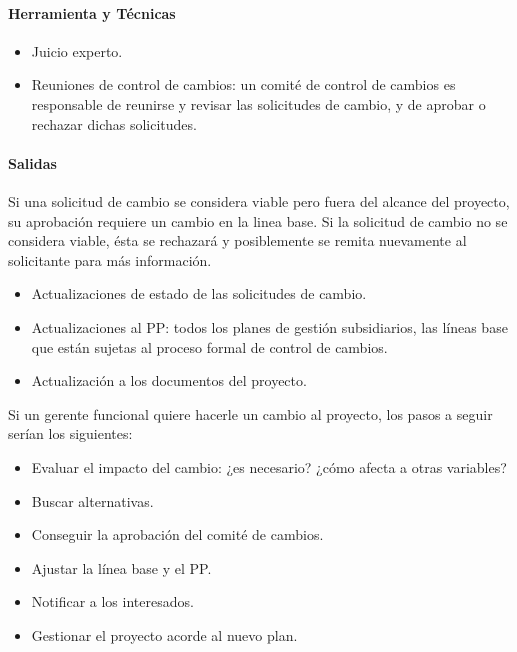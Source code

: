 \documentclass[a4paper,twosides]{article}
\newlength{\wideitemsep}
\let\olditem\item
\renewcommand{\item}{\setlength{\itemsep}{\wideitemsep}\olditem}
\begin{document}
\paragraph{Herramienta y Técnicas}
\begin{itemize}
\item Juicio experto.
\item Reuniones de control de cambios: un comité de control de cambios es responsable de reunirse y revisar las solicitudes de cambio, y de aprobar o rechazar dichas solicitudes.
\end{itemize}
\paragraph{Salidas}
Si una solicitud de cambio se considera viable pero fuera del alcance del proyecto, su aprobación requiere un cambio en la linea base. Si la solicitud de cambio no se considera viable, ésta se rechazará y posiblemente se remita nuevamente al solicitante para más información.
\begin{itemize}
\item Actualizaciones de estado de las solicitudes de cambio.
\item Actualizaciones al PP: todos los planes de gestión subsidiarios, las líneas base que están sujetas al proceso formal de control de cambios.
\item Actualización a los documentos del proyecto.
\end{itemize}
Si un gerente funcional quiere hacerle un cambio al proyecto, los pasos a seguir serían los siguientes:
\begin{itemize}
\item Evaluar el impacto del cambio: ¿es necesario? ¿cómo afecta a otras variables?
\item Buscar alternativas.
\item Conseguir la aprobación del comité de cambios.
\item Ajustar la línea base y el PP.
\item Notificar a los interesados.
\item Gestionar el proyecto acorde al nuevo plan.
\end{itemize}
\end{document}
